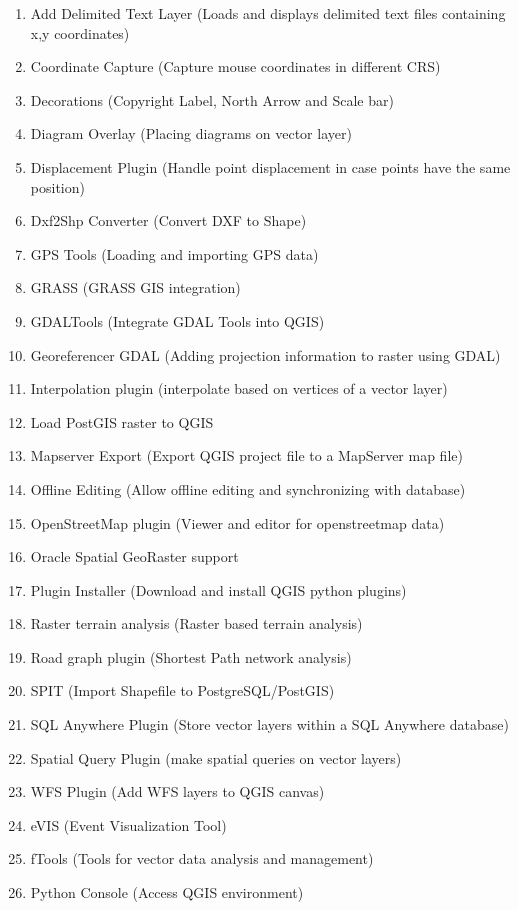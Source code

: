 
\begin{enumerate}
\item Add Delimited Text Layer (Loads and displays delimited text files
containing x,y coordinates)
\item Coordinate Capture (Capture mouse coordinates in different CRS)
\item Decorations (Copyright Label, North Arrow and Scale bar)
\item Diagram Overlay (Placing diagrams on vector layer)
\item Displacement Plugin (Handle point displacement in case points have the same position)
\item Dxf2Shp Converter (Convert DXF to Shape)
\item GPS Tools (Loading and importing GPS data)
\item GRASS (GRASS GIS integration)
\item GDALTools (Integrate GDAL Tools into QGIS)
\item Georeferencer GDAL (Adding projection information to raster using GDAL)
\item Interpolation plugin (interpolate based on vertices of a vector layer)
\item Load PostGIS raster to QGIS 
\item Mapserver Export (Export QGIS project file to a MapServer map file)
\item Offline Editing (Allow offline editing and synchronizing with database)
\item OpenStreetMap plugin (Viewer and editor for openstreetmap data)
\item Oracle Spatial GeoRaster support
\item Plugin Installer (Download and install QGIS python plugins)
\item Raster terrain analysis (Raster based terrain analysis)
\item Road graph plugin (Shortest Path network analysis)
\item SPIT (Import Shapefile to PostgreSQL/PostGIS)
\item SQL Anywhere Plugin (Store vector layers within a SQL Anywhere database)
\item Spatial Query Plugin (make spatial queries on vector layers)
\item WFS Plugin (Add WFS layers to QGIS canvas)
\item eVIS (Event Visualization Tool)
\item fTools (Tools for vector data analysis and management)
\item Python Console (Access QGIS environment)
\end{enumerate}

